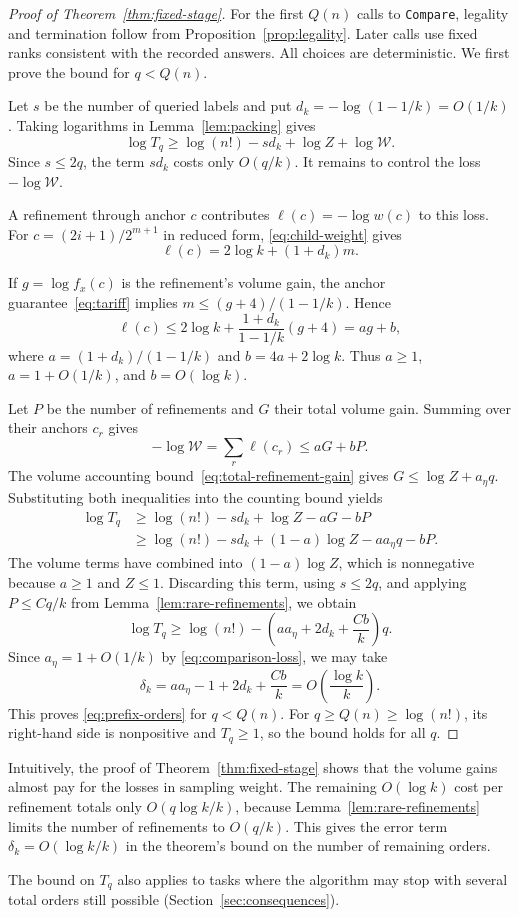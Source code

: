 \begin{proof}[Proof of Theorem~\ref{thm:fixed-stage}]
For the first $Q(n)$ calls to \texttt{Compare}, legality and termination
follow from Proposition~\ref{prop:legality}. Later calls use fixed ranks
consistent with the recorded answers. All choices are deterministic.
We first prove the bound for $q<Q(n)$.

Let $s$ be the number of queried labels and put
$d_k=-\log(1-1/k)=O(1/k)$. Taking logarithms in
Lemma~\ref{lem:packing} gives
\[
\log T_q\ge\log(n!)-s d_k+\log Z+\log\mathcal W.
\]
Since $s\le2q$, the term $s d_k$ costs only $O(q/k)$.
It remains to control the loss $-\log\mathcal W$.

A refinement through anchor $c$ contributes $\ell(c)=-\log w(c)$ to
this loss. For $c=(2i+1)/2^{m+1}$ in reduced form,
\eqref{eq:child-weight} gives
\[
\ell(c)=2\log k+(1+d_k)m.
\]
\begin{samepage}
If $g=\log f_x(c)$ is the refinement's volume gain, the anchor
guarantee~\eqref{eq:tariff} implies $m\le(g+4)/(1-1/k)$. Hence
\[
\ell(c)\le 2\log k+\frac{1+d_k}{1-1/k}(g+4)=ag+b,
\]
where $a=(1+d_k)/(1-1/k)$ and $b=4a+2\log k$.
Thus $a\ge1$, $a=1+O(1/k)$, and $b=O(\log k)$.

\end{samepage}

Let $P$ be the number of refinements and $G$ their total volume gain.
Summing over their anchors $c_r$ gives
\[
-\log\mathcal W=\sum_r\ell(c_r)\le aG+bP.
\]
The volume accounting bound~\eqref{eq:total-refinement-gain} gives
$G\le\log Z+a_\eta q$. Substituting both inequalities into the counting
bound yields
\begin{align*}
\log T_q
&\ge \log(n!)-s d_k+\log Z-aG-bP\\
&\ge \log(n!)-s d_k+(1-a)\log Z-aa_\eta q-bP.
\end{align*}
The volume terms have combined into $(1-a)\log Z$, which is nonnegative
because $a\ge1$ and $Z\le1$. Discarding this term, using $s\le2q$, and
applying $P\le Cq/k$ from Lemma~\ref{lem:rare-refinements}, we obtain
\[
\log T_q\ge\log(n!)-\left(aa_\eta+2d_k+\frac{Cb}{k}\right)q.
\]
Since $a_\eta=1+O(1/k)$ by \eqref{eq:comparison-loss}, we may take
\[
\delta_k=aa_\eta-1+2d_k+\frac{Cb}{k}
        =O\!\left(\frac{\log k}{k}\right).
\]
This proves \eqref{eq:prefix-orders} for $q<Q(n)$.
For $q\ge Q(n)\ge\log(n!)$, its right-hand side is nonpositive and
$T_q\ge1$, so the bound holds for all $q$.
\end{proof}

Intuitively, the proof of Theorem~\ref{thm:fixed-stage} shows that the
volume gains almost pay for the losses in sampling weight. The remaining
$O(\log k)$ cost per refinement totals only $O(q\log k/k)$, because
Lemma~\ref{lem:rare-refinements} limits the number of refinements to
$O(q/k)$. This gives the error term $\delta_k=O(\log k/k)$ in the
theorem's bound on the number of remaining orders.

The bound on $T_q$ also applies to tasks where the algorithm may stop
with several total orders still possible (Section~\ref{sec:consequences}).
